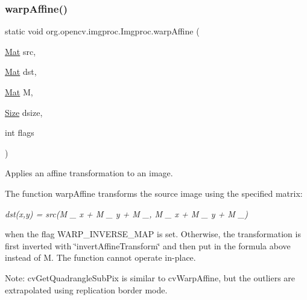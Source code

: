\mbox{\label{classorg_1_1opencv_1_1imgproc_1_1_imgproc_a261169d40fb66824c5cb3e5f86df0799}} 
\subsubsection{\texorpdfstring{warp\+Affine()}{warpAffine()}\hspace{0.1cm}{\footnotesize\ttfamily [2/3]}}
{\footnotesize\ttfamily static void org.\+opencv.\+imgproc.\+Imgproc.\+warp\+Affine (\begin{DoxyParamCaption}\item[{\mbox{\hyperlink{classorg_1_1opencv_1_1core_1_1_mat}{Mat}}}]{src,  }\item[{\mbox{\hyperlink{classorg_1_1opencv_1_1core_1_1_mat}{Mat}}}]{dst,  }\item[{\mbox{\hyperlink{classorg_1_1opencv_1_1core_1_1_mat}{Mat}}}]{M,  }\item[{\mbox{\hyperlink{classorg_1_1opencv_1_1core_1_1_size}{Size}}}]{dsize,  }\item[{int}]{flags }\end{DoxyParamCaption})\hspace{0.3cm}{\ttfamily [static]}}

Applies an affine transformation to an image.

The function {\ttfamily warp\+Affine} transforms the source image using the specified matrix\+:

{\itshape dst(x,y) = src(M \+\_ x + M \+\_ y + M \+\_, M \+\_ x + M \+\_ y + M \+\_)}

when the flag {\ttfamily W\+A\+R\+P\+\_\+\+I\+N\+V\+E\+R\+S\+E\+\_\+\+M\+AP} is set. Otherwise, the transformation is first inverted with \char`\"{}invert\+Affine\+Transform\char`\"{} and then put in the formula above instead of {\ttfamily M}. The function cannot operate in-\/place.

Note\+: {\ttfamily cv\+Get\+Quadrangle\+Sub\+Pix} is similar to {\ttfamily cv\+Warp\+Affine}, but the outliers are extrapolated using replication border mode.


